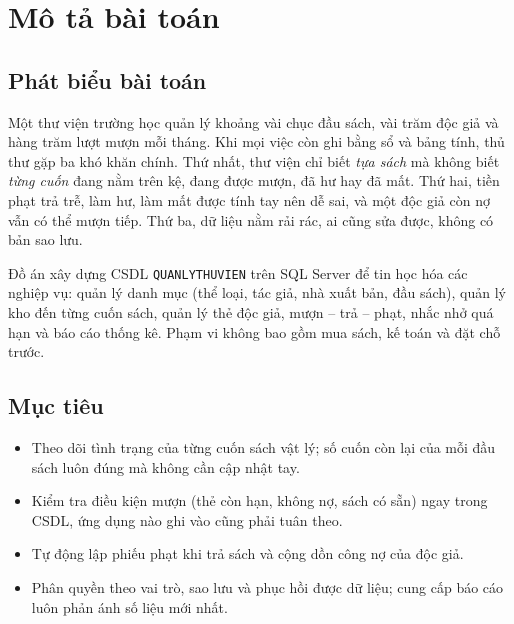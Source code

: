 \documentclass[a4paper,oneside]{report}
\begin{document}
\cleardoublepage
\tableofcontents
\cleardoublepage
\listoftables
\vspace{1cm}
\listoffigures

\chapter{Mô tả bài toán}

\section{Phát biểu bài toán}
Một thư viện trường học quản lý khoảng vài chục đầu sách, vài trăm độc giả và hàng trăm lượt mượn mỗi tháng. Khi mọi việc còn ghi bằng sổ và bảng tính, thủ thư gặp ba khó khăn chính. Thứ nhất, thư viện chỉ biết \emph{tựa sách} mà không biết \emph{từng cuốn} đang nằm trên kệ, đang được mượn, đã hư hay đã mất. Thứ hai, tiền phạt trả trễ, làm hư, làm mất được tính tay nên dễ sai, và một độc giả còn nợ vẫn có thể mượn tiếp. Thứ ba, dữ liệu nằm rải rác, ai cũng sửa được, không có bản sao lưu.

Đồ án xây dựng CSDL \texttt{QUANLYTHUVIEN} trên SQL Server để tin học hóa các nghiệp vụ: quản lý danh mục (thể loại, tác giả, nhà xuất bản, đầu sách), quản lý kho đến từng cuốn sách, quản lý thẻ độc giả, mượn – trả – phạt, nhắc nhở quá hạn và báo cáo thống kê. Phạm vi không bao gồm mua sách, kế toán và đặt chỗ trước.

\section{Mục tiêu}
\begin{itemize}
\item Theo dõi tình trạng của từng cuốn sách vật lý; số cuốn còn lại của mỗi đầu sách luôn đúng mà không cần cập nhật tay.
\item Kiểm tra điều kiện mượn (thẻ còn hạn, không nợ, sách có sẵn) ngay trong CSDL, ứng dụng nào ghi vào cũng phải tuân theo.
\item Tự động lập phiếu phạt khi trả sách và cộng dồn công nợ của độc giả.
\item Phân quyền theo vai trò, sao lưu và phục hồi được dữ liệu; cung cấp báo cáo luôn phản ánh số liệu mới nhất.
\end{itemize}
\end{document}
